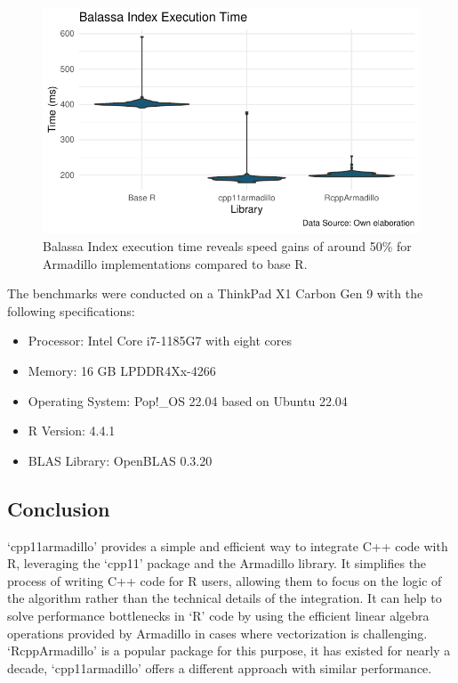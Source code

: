 \documentclass[
  10pt,
  letterpaper,
]{article}
\providecommand{\tightlist}{%
  \setlength{\itemsep}{0pt}\setlength{\parskip}{0pt}}\usepackage{longtable,booktabs,array}
\begin{document}
\begin{figure}[H]

{\centering \includegraphics{cpp11armadillo_files/figure-pdf/benchmark-1.pdf}

}

\caption{Balassa Index execution time reveals speed gains of around 50\%
for Armadillo implementations compared to base R.}

\end{figure}%

\newpage

The benchmarks were conducted on a ThinkPad X1 Carbon Gen 9 with the
following specifications:

\begin{itemize}
\tightlist
\item
  Processor: Intel Core i7-1185G7 with eight cores
\item
  Memory: 16 GB LPDDR4Xx-4266
\item
  Operating System: Pop!\_OS 22.04 based on Ubuntu 22.04
\item
  R Version: 4.4.1
\item
  BLAS Library: OpenBLAS 0.3.20
\end{itemize}

\subsection{Conclusion}\label{conclusion}

`cpp11armadillo' provides a simple and efficient way to integrate C++
code with R, leveraging the `cpp11' package and the Armadillo library.
It simplifies the process of writing C++ code for R users, allowing them
to focus on the logic of the algorithm rather than the technical details
of the integration. It can help to solve performance bottlenecks in `R'
code by using the efficient linear algebra operations provided by
Armadillo in cases where vectorization is challenging. `RcppArmadillo'
is a popular package for this purpose, it has existed for nearly a
decade, `cpp11armadillo' offers a different approach with similar
performance.


\nolinenumbers
  
\end{document}
